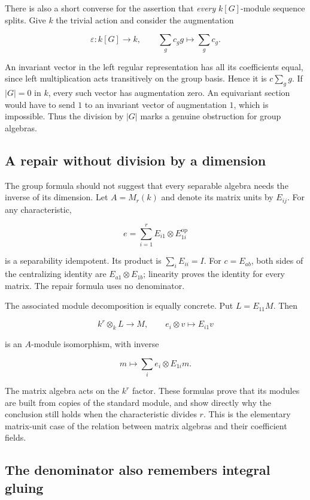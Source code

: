 \documentclass[
  11pt,
]{article}
\begin{document}
There is also a short converse for the assertion that \emph{every}
\(k[G]\)-module sequence splits. Give \(k\) the trivial action and
consider the augmentation

\[
\varepsilon:k[G]\longrightarrow k,\qquad
\sum_g c_g g\longmapsto\sum_g c_g.
\]

An invariant vector in the left regular representation has all its
coefficients equal, since left multiplication acts transitively on the
group basis. Hence it is \(c\sum_g g\). If \(|G|=0\) in \(k\), every
such vector has augmentation zero. An equivariant section would have to
send \(1\) to an invariant vector of augmentation \(1\), which is
impossible. Thus the division by \(|G|\) marks a genuine obstruction for
group algebras.

\subsection{A repair without division by a
dimension}\label{a-repair-without-division-by-a-dimension}

The group formula should not suggest that every separable algebra needs
the inverse of its dimension. Let \(A=M_r(k)\) and denote its matrix
units by \(E_{ij}\). For any characteristic,

\[
e=\sum_{i=1}^r E_{i1}\otimes E_{1i}^{\mathrm{op}}    \tag{A17}
\]

is a separability idempotent. Its product is \(\sum_i E_{ii}=I\). For
\(c=E_{ab}\), both sides of the centralizing identity are
\(E_{a1}\otimes E_{1b}\); linearity proves the identity for every
matrix. The repair formula uses no denominator.

The associated module decomposition is equally concrete. Put
\(L=E_{11}M\). Then

\[
k^r\otimes_k L\longrightarrow M,\qquad
e_i\otimes v\longmapsto E_{i1}v
\]

is an \(A\)-module isomorphism, with inverse

\[
m\longmapsto\sum_i e_i\otimes E_{1i}m.
\]

The matrix algebra acts on the \(k^r\) factor. These formulas prove that
its modules are built from copies of the standard module, and show
directly why the conclusion still holds when the characteristic divides
\(r\). This is the elementary matrix-unit case of the relation between
matrix algebras and their coefficient fields.

\subsection{The denominator also remembers integral
gluing}\label{the-denominator-also-remembers-integral-gluing}
\end{document}
